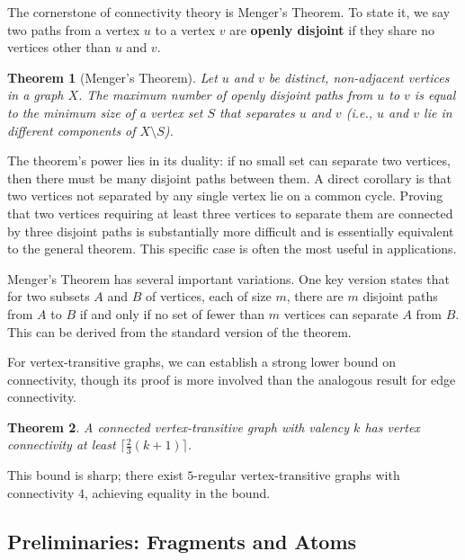 \documentclass[12pt,a4paper,openany]{book}
\newtheorem{theorem}{Theorem}[section]
\begin{document}
The cornerstone of connectivity theory is Menger's Theorem. To state it, we say two paths from a vertex $u$ to a vertex $v$ are \textbf{openly disjoint} if they share no vertices other than $u$ and $v$.

\begin{theorem}[Menger's Theorem]\label{thm:menger}
Let $u$ and $v$ be distinct, non-adjacent vertices in a graph $X$. The maximum number of openly disjoint paths from $u$ to $v$ is equal to the minimum size of a vertex set $S$ that separates $u$ and $v$ (i.e., $u$ and $v$ lie in different components of $X \setminus S$).
\end{theorem}

The theorem's power lies in its duality: if no small set can separate two vertices, then there must be many disjoint paths between them. A direct corollary is that two vertices not separated by any single vertex lie on a common cycle. Proving that two vertices requiring at least three vertices to separate them are connected by three disjoint paths is substantially more difficult and is essentially equivalent to the general theorem. This specific case is often the most useful in applications.

Menger's Theorem has several important variations. One key version states that for two subsets $A$ and $B$ of vertices, each of size $m$, there are $m$ disjoint paths from $A$ to $B$ if and only if no set of fewer than $m$ vertices can separate $A$ from $B$. This can be derived from the standard version of the theorem.

For vertex-transitive graphs, we can establish a strong lower bound on connectivity, though its proof is more involved than the analogous result for edge connectivity.

\begin{theorem}\label{thm:vertex-connectivity-lower-bound}
A connected vertex-transitive graph with valency $k$ has vertex connectivity at least $\lceil \frac{2}{3}(k + 1) \rceil$.
\end{theorem}

This bound is sharp; there exist $5$-regular vertex-transitive graphs with connectivity $4$, achieving equality in the bound.

\subsection*{Preliminaries: Fragments and Atoms}
\end{document}
